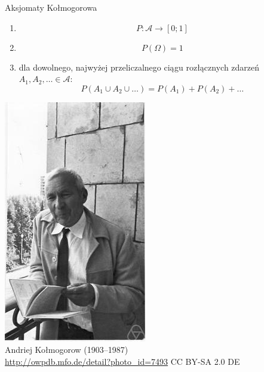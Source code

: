 \documentclass{mp}
\begin{document}
\begin{frame}{Aksjomaty Kołmogorowa}
\begin{minipage}{.6\textwidth}
\begin{enumerate}
\item \[P\colon \mathcal{A} \to \left[0;1\right]\]
\item \[P(\Omega)=1\]
\item dla dowolnego, najwyżej przeliczalnego ciągu rozłącznych zdarzeń $A_1, A_2, \ldots \in \mathcal{A}$: \[ P(A_1\cup A_2\cup \ldots)=P(A_1)+P(A_2)+\ldots\]
\end{enumerate}
\end{minipage}
\begin{minipage}{.39\textwidth}
\centering \includegraphics[width=\textwidth,clip,viewport=0 0 10cm 11cm]{kolmogorov.jpg} \\
Andriej Kołmogorow (1903--1987) \\
{\tiny \url{http://owpdb.mfo.de/detail?photo_id=7493} CC BY-SA 2.0 DE}
\end{minipage}
\end{frame}
\end{document}
